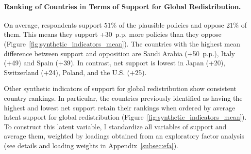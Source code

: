 \documentclass[12pt,english]{article}
\begin{document}
\begin{bibunit}

\paragraph{Ranking of Countries in Terms of Support for Global Redistribution.}\label{par:ranking}

On average, respondents support 51\% of the plausible policies and oppose 21\% of them. This means they support +30~p.p. more policies than they oppose (Figure~\ref{fig:synthetic_indicators_mean}). The countries with the highest mean difference between support and opposition are Saudi Arabia (+50~p.p.), Italy (+49) and Spain (+39). In contrast, net support is lowest in Japan (+20), Switzerland (+24), Poland, and the U.S. (+25). %

Other synthetic indicators of support for global redistribution show consistent country rankings. In particular, the countries previously identified as having the highest and lowest net support retain their rankings when ordered by average latent support for global redistribution (Figure~\ref{fig:synthetic_indicators_mean}). 
To construct this latent variable, I standardize all variables of support and average them, weighted by loadings obtained from an exploratory factor analysis (see details and loading weights in Appendix~\ref{subsec:efa}). 


\end{bibunit}
\end{document}
